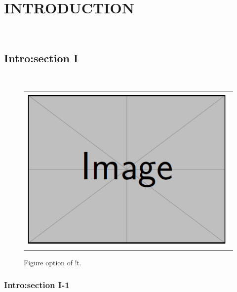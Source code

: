 
\chapter{INTRODUCTION}
\lipsum[1-4]~\cite{anderson1964hard}

\section{Intro:section I}
\lipsum[1-4]~\cite{anderson1964hard}

\begin{figure}[!t]
	{
	\begin{center}
		\begin{tabular}{c}
			\includegraphics[width=0.9\linewidth]{dummy.png}
		\end{tabular}
	\end{center}
	}
	\caption[dummy image FIXME1]{Figure option of $!\text{t}$.}
\label{dummy_img1}
\end{figure}

\subsection{Intro:section I-1}
\lipsum[1-4]~\cite{anderson1964hard}

